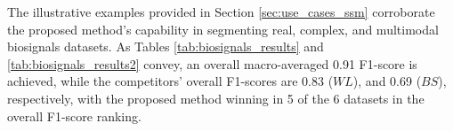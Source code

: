 \begin{table}
    \centering
    \caption{Results to summarize the comparison between the methods tested. In this table, each record of each dataset is counted for each method as a win, draw or loss. The count is made for each dataset and finally, for all datasets altogether (W|D|L).}
    \label{tab:biosignals_results2}
\end{table}

The illustrative examples provided in Section \ref{sec:use_cases_ssm} corroborate the proposed method's capability in segmenting real, complex, and multimodal biosignals datasets. As Tables \ref{tab:biosignals_results} and \ref{tab:biosignals_results2} convey, an overall macro-averaged 0.91 F1-score is achieved, while the competitors' overall F1-scores are 0.83 ($WL$), and 0.69 ($BS$), respectively, with the proposed method winning in 5 of the 6 datasets in the overall F1-score ranking.

